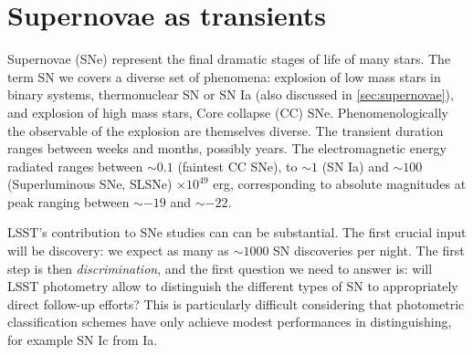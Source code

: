 %
%
%
%
%
%
%
%

\section{Supernovae as transients}
\def\secname{SNtransients}\label{sec:\secname} %


Supernovae (SNe) represent the final dramatic stages of life of many stars. The term SN we covers a diverse set of phenomena: explosion of low mass stars in binary systems, thermonuclear SN or SN Ia (also discussed in \ref{sec:supernovae}), and explosion of high mass stars, Core collapse (CC) SNe. Phenomenologically the observable of the explosion are themselves diverse.  The transient duration ranges between weeks and months, possibly years. The electromagnetic energy radiated ranges between $\sim0.1$ (faintest CC SNe), to $\sim1$ (SN Ia) and $\sim100$ (Superluminous SNe, SLSNe) $\times 10^{49}$ erg, corresponding to absolute magnitudes at peak ranging between $\sim-19$ and $\sim-22$.

LSST's contribution to SNe studies can can be substantial. The first crucial input will be discovery: we expect as many as $\sim 1000$ SN discoveries per night. The first step is then \emph{discrimination}, and the first question we need to answer is: will LSST photometry allow to distinguish the different types of SN to appropriately direct follow-up efforts? This is particularly difficult considering that photometric classification schemes have only achieve modest performances in distinguishing, for example SN Ic from Ia. 

